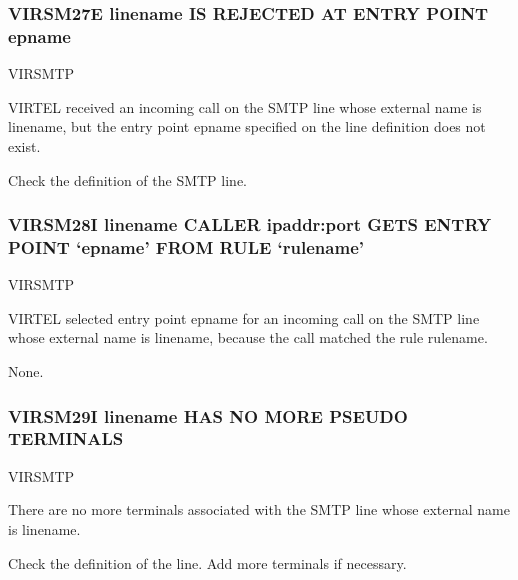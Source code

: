 \documentclass[letterpaper,10pt,english]{sphinxmanual}
\begin{document}
\subsubsection{VIRSM27E linename IS REJECTED AT ENTRY POINT epname}
\label{\detokenize{messages:virsm27e-linename-is-rejected-at-entry-point-epname}}\begin{description}
\sphinxAtStartPar
VIRSMTP

\sphinxAtStartPar
VIRTEL received an incoming call on the SMTP line whose external name is linename, but the entry point epname specified on the line definition does not exist.

\sphinxAtStartPar
Check the definition of the SMTP line.

\end{description}


\subsubsection{VIRSM28I linename CALLER ipaddr:port GETS ENTRY POINT ‘epname’ FROM RULE ‘rulename’}
\label{\detokenize{messages:virsm28i-linename-caller-ipaddr-port-gets-entry-point-epname-from-rule-rulename}}\begin{description}
\sphinxAtStartPar
VIRSMTP

\sphinxAtStartPar
VIRTEL selected entry point epname for an incoming call on the SMTP line whose external name is linename, because the call matched the rule rulename.

\sphinxAtStartPar
None.

\end{description}


\subsubsection{VIRSM29I linename HAS NO MORE PSEUDO TERMINALS}
\label{\detokenize{messages:virsm29i-linename-has-no-more-pseudo-terminals}}\begin{description}
\sphinxAtStartPar
VIRSMTP

\sphinxAtStartPar
There are no more terminals associated with the SMTP line whose external name is linename.

\sphinxAtStartPar
Check the definition of the line. Add more terminals if necessary.

\end{description}
\end{document}
